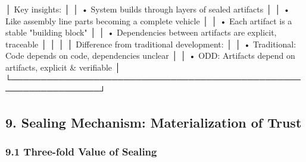 \documentclass[
]{article}
\newenvironment{Shaded}{}{}
\newcommand{\NormalTok}[1]{#1}
\begin{document}
\begin{Shaded}
\begin{Highlighting}[]
\NormalTok{│  Key insights:                                                  │}
\NormalTok{│  • System builds through layers of sealed artifacts             │}
\NormalTok{│  • Like assembly line parts becoming a complete vehicle         │}
\NormalTok{│  • Each artifact is a stable "building block"                   │}
\NormalTok{│  • Dependencies between artifacts are explicit, traceable       │}
\NormalTok{│                                                                  │}
\NormalTok{│  Difference from traditional development:                       │}
\NormalTok{│  • Traditional: Code depends on code, dependencies unclear      │}
\NormalTok{│  • ODD: Artifacts depend on artifacts, explicit \& verifiable    │}
\NormalTok{└─────────────────────────────────────────────────────────────────┘}
\end{Highlighting}
\end{Shaded}

\hypertarget{9-sealing-mechanism-materialization-of-trust}{%
\subsection{9. Sealing Mechanism: Materialization of
Trust}\label{9-sealing-mechanism-materialization-of-trust}}

\hypertarget{91-three-fold-value-of-sealing}{%
\subsubsection{9.1 Three-fold Value of
Sealing}\label{91-three-fold-value-of-sealing}}
\end{document}
